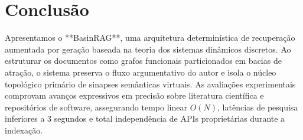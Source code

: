 \documentclass[10pt,twocolumn]{article}
\theoremstyle{definition}
\begin{document}
\section{Conclusão}

Apresentamos o **BasinRAG**, uma arquitetura determinística de recuperação aumentada por geração baseada na teoria dos sistemas dinâmicos discretos. Ao estruturar os documentos como grafos funcionais particionados em bacias de atração, o sistema preserva o fluxo argumentativo do autor e isola o núcleo topológico primário de sinapses semânticas virtuais. As avaliações experimentais comprovam avanços expressivos em precisão sobre literatura científica e repositórios de software, assegurando tempo linear $O(N)$, latências de pesquisa inferiores a 3 segundos e total independência de APIs proprietárias durante a indexação.
\end{document}

